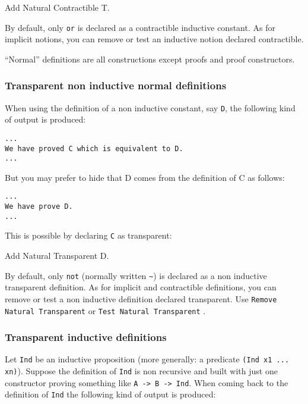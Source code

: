 \begin{coq_example*}
Add Natural Contractible T.
\end{coq_example*}

By default, only \verb=or= is declared as a contractible inductive
constant.
As for implicit notions, you can remove or test an inductive notion declared
contractible.


``Normal'' definitions are all constructions except proofs and proof constructors.

\subsubsection*{Transparent non inductive normal definitions}

When using the definition of a non inductive constant, say \verb=D=, the
following kind of output is produced:

\begin{verbatim}
...
We have proved C which is equivalent to D.
...
\end{verbatim}

But you may prefer to hide that D comes from the definition of C as
follows:

\begin{verbatim}
...
We have prove D.
...
\end{verbatim}

This is possible by declaring \verb=C= as transparent:

\begin{coq_example*}
Add Natural Transparent D.
\end{coq_example*}

By default, only \verb=not= (normally written \verb=~=) is declared as
a non inductive transparent definition.
As for implicit and contractible definitions, you can remove or test a
non inductive definition declared transparent.
Use \texttt{Remove Natural Transparent} \ident or 
\texttt{Test Natural Transparent} \ident.

\subsubsection*{Transparent inductive definitions}

Let \verb=Ind= be an inductive proposition (more generally: a
predicate \verb=(Ind x1 ... xn)=). Suppose the definition of
\verb=Ind= is non recursive and built with just
one constructor proving something like \verb=A -> B -> Ind=.
When coming back to the definition of \verb=Ind= the
following kind of output is produced:

